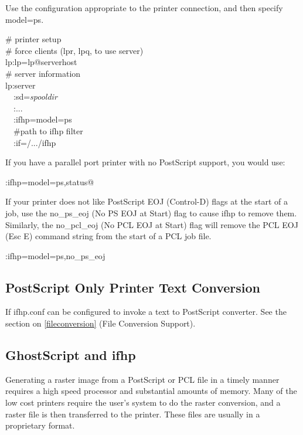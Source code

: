 \documentclass[a4paper]{article}
\begin{document}
Use the configuration appropriate to the printer connection,
and then specify
{\ttfamily model=ps}.
\begin{tscreen}
\# printer setup  \\ 
\#  force clients (lpr, lpq, to use server)\\ 
lp:lp=lp@serverhost \\ 
\# server information  \\ 
lp:server  \\ 
~~:sd={\itshape spooldir\/} \\ 
~~:...  \\ 
~~:ifhp=model=ps \\ 
~~\#path to ifhp filter  \\ 
~~:if=/.../ifhp  \\ 
\end{tscreen}


If you have a parallel port printer with no PostScript support,
you would use:
\begin{tscreen}
:ifhp=model=ps,status@
\end{tscreen}


\label{no_ps_eoj}
\label{no_pcl_eoj}
If your printer does not like PostScript EOJ (Control-D)
flags at the start of a job,
use the
{\ttfamily no\_ps\_eoj} (No PS EOJ at Start)
flag to cause {\ttfamily ifhp} to remove them.
Similarly,
the
{\ttfamily no\_pcl\_eoj} (No PCL EOJ at Start)
flag will remove the PCL EOJ (Esc E)
command string from the start of a PCL job file.
\begin{tscreen}
:ifhp=model=ps,no\_ps\_eoj
\end{tscreen}



\subsection{PostScript Only Printer Text Conversion}

If {\ttfamily ifhp.conf}
can be configured to invoke a text to PostScript converter.
See the section on
\ref{fileconversion} {(File Conversion Support)}.


\subsection{GhostScript and ifhp}

Generating a raster image from a PostScript or PCL file in
a timely manner requires a high speed processor and substantial amounts
of memory.
Many of the low cost printers require the user's system to do the raster
conversion,
and a raster file is then transferred to the printer.
These files are usually in a proprietary format.
\end{document}

